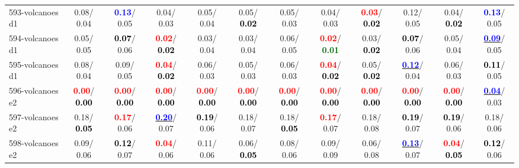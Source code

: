 \begin{table}[h]
\begin{center}
{\begin{tabular}{lc|c|c|c|c|c|c|c|c|c|c}
593-volcanoes d1 &   0.08/  0.04 & \textcolor{blue}{\textbf{  0.13}}/  0.05 &   0.04/  0.03 &   0.05/  0.04 &   0.05/\textcolor{black}{\textbf{  0.02}} &   0.05/  0.03 &   0.04/  0.03 & \textcolor{red}{\textbf{  0.03}}/\textcolor{black}{\textbf{  0.02}} &   0.12/  0.05 &   0.04/\textcolor{black}{\textbf{  0.02}} & \textcolor{blue}{\textbf{  0.13}}/  0.05 \\
594-volcanoes d1 &   0.05/  0.05 & \textcolor{black}{\textbf{  0.07}}/  0.06 & \textcolor{red}{\textbf{  0.02}}/\textcolor{black}{\textbf{  0.02}} &   0.03/  0.04 &   0.03/  0.04 &   0.06/  0.05 & \textcolor{red}{\textbf{  0.02}}/\textcolor{darkgreen}{\textbf{  0.01}} &   0.03/\textcolor{black}{\textbf{  0.02}} & \textcolor{black}{\textbf{  0.07}}/  0.06 &   0.05/  0.04 & \underline{\textcolor{blue}{\textbf{  0.09}}}/  0.05 \\
595-volcanoes d1 &   0.08/  0.04 &   0.09/  0.05 & \textcolor{red}{\textbf{  0.04}}/\textcolor{black}{\textbf{  0.02}} &   0.06/  0.03 &   0.05/  0.03 &   0.06/  0.03 & \textcolor{red}{\textbf{  0.04}}/\textcolor{black}{\textbf{  0.02}} &   0.05/\textcolor{black}{\textbf{  0.02}} & \underline{\textcolor{blue}{\textbf{  0.12}}}/  0.04 &   0.06/  0.03 & \textcolor{black}{\textbf{  0.11}}/  0.05 \\
596-volcanoes e2 & \textcolor{red}{\textbf{  0.00}}/\textcolor{black}{\textbf{  0.00}} & \textcolor{red}{\textbf{  0.00}}/\textcolor{black}{\textbf{  0.00}} & \textcolor{red}{\textbf{  0.00}}/\textcolor{black}{\textbf{  0.00}} & \textcolor{red}{\textbf{  0.00}}/\textcolor{black}{\textbf{  0.00}} & \textcolor{red}{\textbf{  0.00}}/\textcolor{black}{\textbf{  0.00}} & \textcolor{red}{\textbf{  0.00}}/\textcolor{black}{\textbf{  0.00}} & \textcolor{red}{\textbf{  0.00}}/\textcolor{black}{\textbf{  0.00}} & \textcolor{red}{\textbf{  0.00}}/\textcolor{black}{\textbf{  0.00}} & \textcolor{red}{\textbf{  0.00}}/\textcolor{black}{\textbf{  0.00}} & \textcolor{red}{\textbf{  0.00}}/\textcolor{black}{\textbf{  0.00}} & \underline{\textcolor{blue}{\textbf{  0.04}}}/  0.03 \\
597-volcanoes e2 &   0.18/\textcolor{black}{\textbf{  0.05}} & \textcolor{red}{\textbf{  0.17}}/  0.06 & \underline{\textcolor{blue}{\textbf{  0.20}}}/  0.07 & \textcolor{black}{\textbf{  0.19}}/  0.06 &   0.18/  0.07 &   0.18/\textcolor{black}{\textbf{  0.05}} & \textcolor{red}{\textbf{  0.17}}/  0.07 &   0.18/  0.08 & \textcolor{black}{\textbf{  0.19}}/  0.07 & \textcolor{black}{\textbf{  0.19}}/  0.06 &   0.18/  0.06 \\ \hline
598-volcanoes e2 &   0.09/  0.06 & \textcolor{black}{\textbf{  0.12}}/  0.07 & \textcolor{red}{\textbf{  0.04}}/  0.06 &   0.11/  0.06 &   0.06/\textcolor{black}{\textbf{  0.05}} &   0.08/  0.06 &   0.09/  0.09 &   0.06/  0.08 & \underline{\textcolor{blue}{\textbf{  0.13}}}/  0.07 & \textcolor{red}{\textbf{  0.04}}/\textcolor{black}{\textbf{  0.05}} & \textcolor{black}{\textbf{  0.12}}/  0.06 \\

\end{tabular}}
\end{center}
\end{table}
